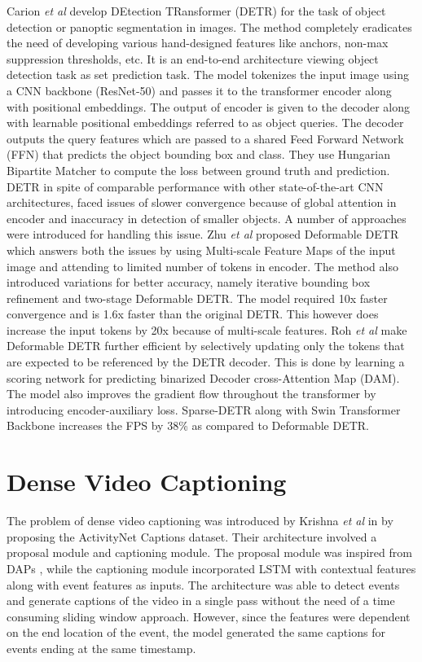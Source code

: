 \par Carion \textit{et al} \cite{carion2020detr} develop DEtection TRansformer (DETR) for the task of object detection or panoptic segmentation in images. The method completely eradicates the need of developing various hand-designed features like anchors, non-max suppression thresholds, etc. It is an end-to-end architecture viewing object detection task as set prediction task. The model tokenizes the input image using a CNN backbone (ResNet-50) and passes it to the transformer encoder along with positional embeddings. The output of encoder is given to the decoder along with learnable positional embeddings referred to as object queries. The decoder outputs the query features which are passed to a shared Feed Forward Network (FFN) that predicts the object bounding box and class. They use Hungarian Bipartite Matcher to compute the loss between ground truth and prediction. DETR in spite of comparable performance with other state-of-the-art CNN architectures, faced issues of slower convergence because of global attention in encoder and inaccuracy in detection of smaller objects. A number of approaches were introduced for handling this issue. Zhu \textit{et al} \cite{zhu2020deformable} proposed Deformable DETR which answers both the issues by using Multi-scale Feature Maps of the input image and attending to limited number of tokens in encoder. The method also introduced variations for better accuracy, namely iterative bounding box refinement and two-stage Deformable DETR. The model required 10x faster convergence and is 1.6x faster than the original DETR. This however does increase the input tokens by 20x because of multi-scale features. Roh \textit{et al} \cite{roh2021sparse} make Deformable DETR further efficient by selectively updating only the tokens that are expected to be referenced by the DETR decoder. This is done by learning a scoring network for predicting binarized Decoder cross-Attention Map (DAM). The model also improves the gradient flow throughout the transformer by introducing encoder-auxiliary loss. Sparse-DETR along with Swin Transformer Backbone increases the FPS by 38\% as compared to Deformable DETR.


\section{Dense Video Captioning}
\par The problem of dense video captioning was introduced by Krishna \textit{et al} in \cite{krishna2017densecaptioning} by proposing the ActivityNet Captions dataset. Their architecture involved a proposal module and captioning module. The proposal module was inspired from DAPs \cite{Escorcia2016DAPsDA}, while the captioning module incorporated LSTM with contextual features along with event features as inputs. The architecture was able to detect events and generate captions of the video in a single pass without the need of a time consuming sliding window approach.  However, since the features were dependent on the end location of the event, the model generated the same captions for events ending at the same timestamp.

